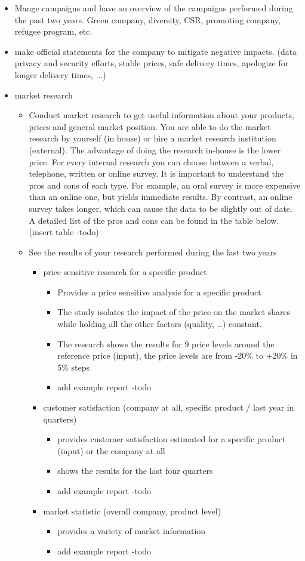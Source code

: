 \documentclass[11pt,titlepage,oneside,openany]{book}
\begin{document}
\begin{itemize} 
\item Mange campaigns and  have an overview of the campaigns performed during the past two years.
Green company, diversity, CSR, promoting company, refugee program, etc. 
\item make official statements for the company to mitigate negative impacts. (data privacy and security efforts, stable prices, safe delivery times, apologize for longer delivery times, ...) 
\item market research 
\begin{itemize} 
\item Conduct market research to get useful information about your products, prices and general market position.
You are able to do the market research by yourself (in house) or  hire a market research institution (external). The advantage of doing the research in-house is the lower price. For every internal research you can choose between a verbal, telephone, written or online survey. It is important to understand the pros and cons of each type. For example, an oral survey is more expensive than an online one, but yields immediate results. By contrast, an online survey takes longer, which can cause the data to be slightly out of date. 
A detailed list of the pros and cons can be found in the table below. (insert table -todo) 
\item See the results of your research performed during the last two years 
\begin{itemize} 
\item price sensitive research for a specific product
\begin{itemize} 
\item Provides a price sensitive analysis for a specific product
\item The study isolates the impact of the price on the market shares while holding all the other factors (quality, …) constant.
\item The research shows the results for 9 price levels around the reference price (input), the price levels are from -20\% to +20\% in 5\% steps 
\item add example report -todo
\end{itemize}
\item customer satisfaction (company at all, specific product / last year in quarters) 
\begin{itemize} 
\item provides customer satisfaction estimated for a specific product (input) or the company at all
\item shows the results for the last four quarters 
\item add example report -todo
\end{itemize}
\item market statistic (overall company, product level) 
\begin{itemize} 
\item provides a variety of market information 
\item add example report -todo
\end{itemize}
\end{itemize}
\end{itemize}
\end{itemize}
\end{document}
